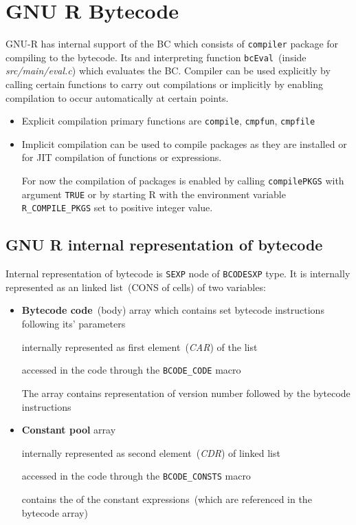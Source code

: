 \documentclass[thesis=M,english]{FITthesis}[2018/10/20]
\newcommand{\code}[1]{\texttt{#1}}
\begin{document}
\section{GNU R Bytecode}

GNU-R has internal support of the BC which consists of \code{compiler} package for compiling to the bytecode. Its and interpreting function \code{bcEval}~(inside \textit{src/main/eval.c}) which evaluates the BC. Compiler can be used explicitly by calling certain functions to carry out compilations or implicitly by enabling compilation to occur automatically at certain points.

\begin{itemize}
  \item Explicit compilation primary functions are \code{compile}, \code{cmpfun}, \code{cmpfile}
  \item Implicit compilation can be used to compile packages as they are installed or for JIT compilation of functions or expressions.

For now the compilation of packages is enabled by calling \code{compilePKGS} with argument \code{TRUE} or by starting R with the environment variable \code{R{\_}COMPILE{\_}PKGS} set to positive integer value.
\end{itemize}


\subsection{GNU R internal representation of bytecode}\label{R-internal-bc-representation}

Internal representation of bytecode is \code{SEXP} node of \code{BCODESXP} type. It is internally represented as an linked list~(CONS of cells) of two variables:
\begin{itemize}
	\item \textbf{Bytecode code}~(body) array which contains set bytecode instructions following its' parameters

		\hspace*{6mm} internally represented as first element~(\textit{CAR}) of the list
		
		\hspace*{6mm} accessed in the code through the \code{BCODE{\_}CODE} macro

		\hspace*{6mm} The array contains representation of version number followed by the bytecode instructions 

	\item \textbf{Constant pool} array

		\hspace*{6mm} internally represented as second element~(\textit{CDR}) of linked list

		\hspace*{6mm} accessed in the code through the \code{BCODE{\_}CONSTS} macro

		\hspace*{6mm} contains the of the constant expressions~(which are referenced in the bytecode array)

\end{itemize}
\end{document}
